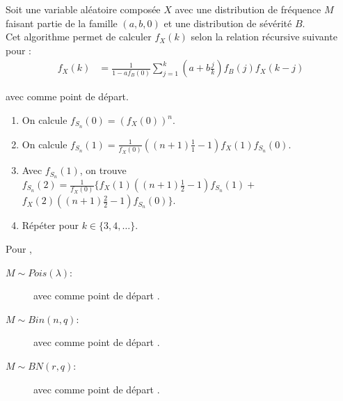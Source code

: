\documentclass[10pt, french]{article}
\begin{document}
\begin{multicols*}{2}
\begin{algo2}
Soit une variable aléatoire composée $X$ avec une distribution de fréquence $M$ faisant partie de la famille $(a, b, 0)$ et une distribution de sévérité $B$.\\

Cet algorithme permet de calculer $f_{X}(k)$ selon la relation récursive suivante pour :
\begin{align*}
	f_{X}(k)
	&=	\frac{1}{1 - af_{B}(0)} \sum_{j = 1}^{k} \left(a + b\frac{j}{k}\right)f_{B}(j)f_{X}(k - j)
\end{align*}

avec  comme point de départ.

\tcbline

\begin{enumerate}
	\item	On calcule $f_{S_{n}}(0)	=	\left(f_{X}(0)\right)^{n}$.
	\item	On calcule $f_{S_{n}}(1)	=	\frac{1}{f_{X}(0)} \left((n + 1)\frac{1}{1} - 1\right)f_{X}(1)f_{S_{n}}(0)$.
	\item	Avec $f_{S_{n}}(1)$, on trouve $f_{S_{n}}(2)	=	\frac{1}{f_{X}(0)} \bigg\{ f_{X}(1)\left((n + 1)\frac{1}{2} - 1\right)f_{S_{n}}(1)	+$ $ f_{X}(2)\left((n + 1)\frac{2}{2} - 1\right)f_{S_{n}}(0) \bigg\}$.
	\item	Répéter pour $k \in \{3, 4, \dots\}$.
\end{enumerate}
\end{algo2}

Pour , 
\begin{description}
	\item[$M \sim Pois(\lambda)$:]	 avec comme point de départ .
	\item[$M \sim Bin(n, q)$:]	 avec comme point de départ .
	\item[$M \sim BN(r, q)$:]	 avec comme point de départ .
\end{description}



\end{multicols*}
\end{document}

